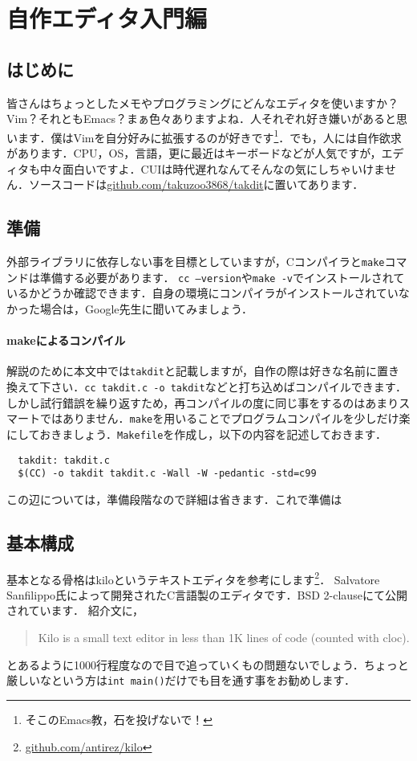\chapter{自作エディタ入門編}

\section{はじめに}
皆さんはちょっとしたメモやプログラミングにどんなエディタを使いますか？Vim？それともEmacs？まぁ色々ありますよね．人それぞれ好き嫌いがあると思います．僕はVimを自分好みに拡張するのが好きです\footnote{そこのEmacs教，石を投げないで！}．でも，人には自作欲求があります．CPU，OS，言語，更に最近はキーボードなどが人気ですが，エディタも中々面白いですよ．CUIは時代遅れなんてそんなの気にしちゃいけません．ソースコードは\href{https://github.com/takuzoo3868/takdit}{github.com/takuzoo3868/takdit}に置いてあります．

\section{準備}



外部ライブラリに依存しない事を目標としていますが，Cコンパイラと\texttt{make}コマンドは準備する必要があります．
\texttt{cc --version}や\texttt{make -v}でインストールされているかどうか確認できます．自身の環境にコンパイラがインストールされていなかった場合は，Google先生に聞いてみましょう．

\subsubsection{makeによるコンパイル}
解説のために本文中では\texttt{takdit}と記載しますが，自作の際は好きな名前に置き換えて下さい．\texttt{cc takdit.c -o takdit}などと打ち込めばコンパイルできます．しかし試行錯誤を繰り返すため，再コンパイルの度に同じ事をするのはあまりスマートではありません．\texttt{make}を用いることでプログラムコンパイルを少しだけ楽にしておきましょう．\texttt{Makefile}を作成し，以下の内容を記述しておきます．
\begin{verbatim}
  takdit: takdit.c
  $(CC) -o takdit takdit.c -Wall -W -pedantic -std=c99
\end{verbatim}
この辺については，準備段階なので詳細は省きます．これで準備は

\section{基本構成}
基本となる骨格はkiloというテキストエディタを参考にします\footnote{\href{https://github.com/antirez/kilo}{github.com/antirez/kilo}}．
Salvatore Sanfilippo氏によって開発されたC言語製のエディタです．BSD 2-clauseにて公開されています．
紹介文に，
\begin{quote}
  Kilo is a small text editor in less than 1K lines of code (counted with cloc).
\end{quote}
とあるように1000行程度なので目で追っていくもの問題ないでしょう．ちょっと厳しいなという方は\texttt{int main()}だけでも目を通す事をお勧めします．

